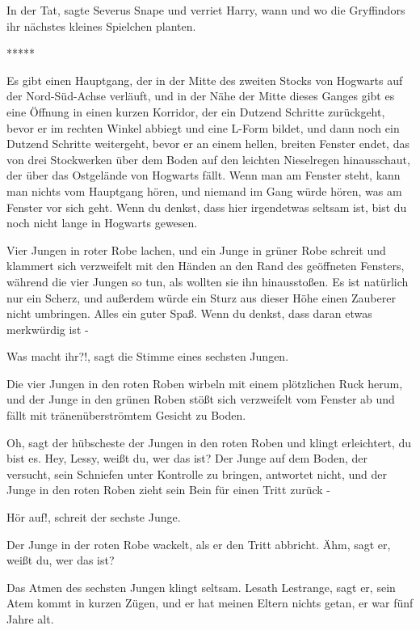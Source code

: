 \glqq{}In der Tat\grqq{}, sagte Severus Snape und verriet Harry, wann und wo die
Gryffindors ihr nächstes kleines Spielchen planten.

\begin{center}*****\end{center}

Es gibt einen Hauptgang, der in der Mitte des zweiten Stocks von Hogwarts auf
der Nord-Süd-Achse verläuft, und in der Nähe der Mitte dieses Ganges gibt es
eine Öffnung in einen kurzen Korridor, der ein Dutzend Schritte zurückgeht,
bevor er im rechten Winkel abbiegt und eine L-Form bildet, und dann noch ein
Dutzend Schritte weitergeht, bevor er an einem hellen, breiten Fenster endet,
das von drei Stockwerken über dem Boden auf den leichten Nieselregen
hinausschaut, der über das Ostgelände von Hogwarts fällt. Wenn man am Fenster
steht, kann man nichts vom Hauptgang hören, und niemand im Gang würde hören, was
am Fenster vor sich geht. Wenn du denkst, dass hier irgendetwas seltsam ist,
bist du noch nicht lange in Hogwarts gewesen.

Vier Jungen in roter Robe lachen, und ein Junge in grüner Robe schreit und
klammert sich verzweifelt mit den Händen an den Rand des geöffneten Fensters,
während die vier Jungen so tun, als wollten sie ihn hinausstoßen. Es ist
natürlich nur ein Scherz, und außerdem würde ein Sturz aus dieser Höhe einen
Zauberer nicht umbringen. Alles ein guter Spaß. Wenn du denkst, dass daran etwas
merkwürdig ist -

\glqq{}Was macht ihr?!\grqq{}, sagt die Stimme eines sechsten Jungen.

Die vier Jungen in den roten Roben wirbeln mit einem plötzlichen Ruck herum, und
der Junge in den grünen Roben stößt sich verzweifelt vom Fenster ab und fällt
mit tränenüberströmtem Gesicht zu Boden.

\glqq{}Oh\grqq{}, sagt der hübscheste der Jungen in den roten Roben und klingt
erleichtert, \glqq{}du bist es. Hey, Lessy, weißt du, wer das ist?\grqq{} Der
Junge auf dem Boden, der versucht, sein Schniefen unter Kontrolle zu bringen,
antwortet nicht, und der Junge in den roten Roben zieht sein Bein für einen
Tritt zurück -

\glqq{}Hör auf!\grqq{}, schreit der sechste Junge.

Der Junge in der roten Robe wackelt, als er den Tritt abbricht.
\glqq{}Ähm\grqq{}, sagt er, \glqq{}weißt du, wer das ist?\grqq{}

Das Atmen des sechsten Jungen klingt seltsam. \glqq{}Lesath Lestrange\grqq{},
sagt er, sein Atem kommt in kurzen Zügen, \glqq{} und er hat meinen Eltern
nichts getan, er war fünf Jahre alt.\grqq{}

